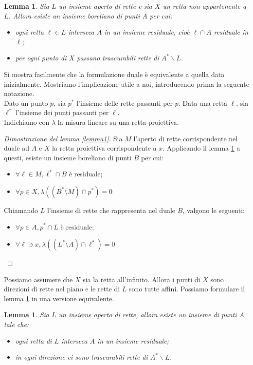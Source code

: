 \documentclass[a4paper, twoside]{article}
\newcommand{\fa}{\forall}
\newcommand{\<}{\langle}
\renewcommand{\>}{\rangle}
\newtheorem{lemma}[teo]{Lemma}
\begin{document}
\begin{lemma} \label{lemma2}
Sia $L$ un insieme aperto di rette e sia $X$ un retta non appartenente a $L$. Allora esiste un insieme boreliano di punti $A$ per cui:

\begin{itemize}
	\item ogni retta $\ell \in L$ interseca $A$ in un insieme residuale, cioè $\ell \cap A$ residuale in $\ell$;
	\item per ogni punto di $X$ passano trascurabili rette di $A^{*} \backslash L$.
\end{itemize}
\end{lemma}

	Si mostra facilmente che la formulazione duale è equivalente a quella data inizialmente. Mostriamo l'implicazione utile a noi, introducendo prima la seguente notazione.\\
	Dato un punto $p$, sia $p^*$ l'insieme delle rette passanti per $p$. Data una retta $\ell$, sia $\ell^*$ l'insieme dei punti passanti per $\ell$.\\
	Indichiamo con $\lambda$ la misura lineare su una retta proiettiva.
	
\begin{proof} [Dimostrazione del lemma \ref{lemma1}]
	Sia $M$ l'aperto di rette corrispondente nel duale ad $A$ e $X$ la retta proiettiva corrispondente a $x$. Applicando il lemma \ref{lemma2} a questi, esiste un insieme boreliano di punti $B$ per cui:
	\begin{itemize}
		\item $\fa \ell \in M, \ell^* \cap B$ è residuale;
		\item $\fa p \in X, \lambda((B^* \setminus M) \cap p^*)=0$
	\end{itemize}
	Chiamando $L$ l'insieme di rette che rappresenta nel duale $B$, valgono le seguenti:
	\begin{itemize}
		\item 	$\fa p \in A, p^* \cap L$ è residuale;
		\item 	$\fa \ell \ni x, \lambda((L^* \setminus A) \cap \ell^*)=0$
	\end{itemize}
\end{proof}

Possiamo assumere che $X$ sia la retta all'infinito. Allora i punti di $X$ sono direzioni di rette nel piano e le rette di $L$ sono tutte affini. Possiamo formulare il lemma \ref{lemma2} in una versione equivalente.

\begin{lemma} \label{lemma2bello}
Sia $L$ un insieme aperto di rette, allora esiste un insieme di punti $A$ tale che:
\begin{itemize}
	\item ogni retta di $L$ interseca $A$ in un insieme residuale;
	\item in ogni direzione ci sono trascurabili rette di  $A^{*} \backslash L$.
\end{itemize}
\end{lemma}
\end{document}

